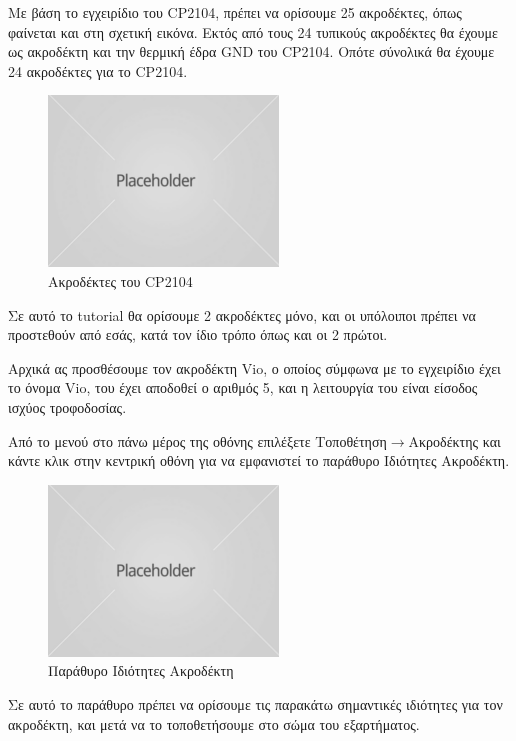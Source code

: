 \documentclass[a4paper]{article}
\begin{document}
Με βάση το εγχειρίδιο του CP2104, πρέπει να ορίσουμε 25 ακροδέκτες, όπως φαίνεται και στη σχετική εικόνα. Εκτός από τους 24 τυπικούς ακροδέκτες θα έχουμε ως ακροδέκτη και την θερμική έδρα GND του CP2104. Οπότε σύνολικά θα έχουμε 24 ακροδέκτες για το CP2104.

\begin{figure}
  \begin{center}
    \includegraphics{img/kicad-main.png}
    \caption{Ακροδέκτες του CP2104}
    \label{fig:kicad-main}
  \end{center}
\end{figure}

Σε αυτό το tutorial θα ορίσουμε 2 ακροδέκτες μόνο, και οι υπόλοιποι πρέπει να προστεθούν από εσάς, κατά τον ίδιο τρόπο όπως και οι 2 πρώτοι.

Αρχικά ας προσθέσουμε τον ακροδέκτη Vio, ο οποίος σύμφωνα με το εγχειρίδιο έχει το όνομα Vio, του έχει αποδοθεί ο αριθμός 5, και η λειτουργία του είναι είσοδος ισχύος τροφοδοσίας.

Από το μενού στο πάνω μέρος της οθόνης επιλέξετε Τοποθέτηση$\rightarrow$Ακροδέκτης και κάντε κλικ στην κεντρική οθόνη για να εμφανιστεί το παράθυρο Ιδιότητες Ακροδέκτη.

\begin{figure}
  \begin{center}
    \includegraphics{img/kicad-main.png}
    \caption{Παράθυρο Ιδιότητες Ακροδέκτη}
    \label{fig:kicad-main}
  \end{center}
\end{figure}

Σε αυτό το παράθυρο πρέπει να ορίσουμε τις παρακάτω σημαντικές ιδιότητες για τον ακροδέκτη, και μετά να το τοποθετήσουμε στο σώμα του εξαρτήματος.
\end{document}
